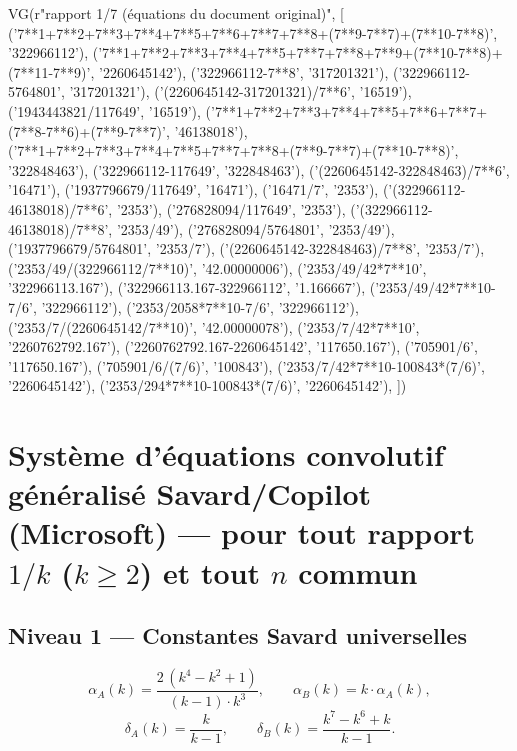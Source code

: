 \documentclass[11pt,a4paper]{article}
\begin{document}
\begin{pycode}
VG(r"rapport 1/7 (équations du document original)", [
  ('7**1+7**2+7**3+7**4+7**5+7**6+7**7+7**8+(7**9-7**7)+(7**10-7**8)', '322966112'),
  ('7**1+7**2+7**3+7**4+7**5+7**7+7**8+7**9+(7**10-7**8)+(7**11-7**9)', '2260645142'),
  ('322966112-7**8', '317201321'),
  ('322966112-5764801', '317201321'),
  ('(2260645142-317201321)/7**6', '16519'),
  ('1943443821/117649', '16519'),
  ('7**1+7**2+7**3+7**4+7**5+7**6+7**7+(7**8-7**6)+(7**9-7**7)', '46138018'),
  ('7**1+7**2+7**3+7**4+7**5+7**7+7**8+(7**9-7**7)+(7**10-7**8)', '322848463'),
  ('322966112-117649', '322848463'),
  ('(2260645142-322848463)/7**6', '16471'),
  ('1937796679/117649', '16471'),
  ('16471/7', '2353'),
  ('(322966112-46138018)/7**6', '2353'),
  ('276828094/117649', '2353'),
  ('(322966112-46138018)/7**8', '2353/49'),
  ('276828094/5764801', '2353/49'),
  ('1937796679/5764801', '2353/7'),
  ('(2260645142-322848463)/7**8', '2353/7'),
  ('2353/49/(322966112/7**10)', '42.00000006'),
  ('2353/49/42*7**10', '322966113.167'),
  ('322966113.167-322966112', '1.166667'),
  ('2353/49/42*7**10-7/6', '322966112'),
  ('2353/2058*7**10-7/6', '322966112'),
  ('2353/7/(2260645142/7**10)', '42.00000078'),
  ('2353/7/42*7**10', '2260762792.167'),
  ('2260762792.167-2260645142', '117650.167'),
  ('705901/6', '117650.167'),
  ('705901/6/(7/6)', '100843'),
  ('2353/7/42*7**10-100843*(7/6)', '2260645142'),
  ('2353/294*7**10-100843*(7/6)', '2260645142'),
])
\end{pycode}



\section{Système d'équations convolutif généralisé Savard/Copilot (Microsoft) --- pour tout rapport \texorpdfstring{$1/k$}{1/k} (\texorpdfstring{$k \ge 2$}{k >= 2}) et tout \texorpdfstring{$n$}{n} commun}

\subsection{Niveau 1 --- Constantes Savard universelles}

\vspace{0.3cm}
\begin{boiteformule}
\[
\alpha_A(k) = \frac{2\,(k^{4} - k^{2} + 1)}{(k-1)\cdot k^{3}},
\qquad
\alpha_B(k) = k \cdot \alpha_A(k),
\]
\[
\delta_A(k) = \frac{k}{k-1},
\qquad
\delta_B(k) = \frac{k^{7} - k^{6} + k}{k-1}.
\]
\end{boiteformule}
\end{document}
